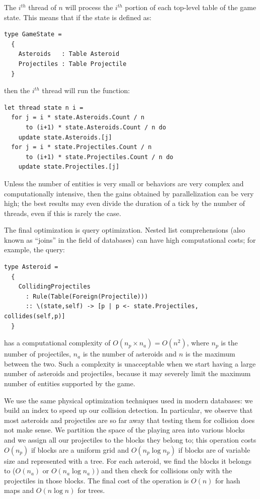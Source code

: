 The $i^{th}$ thread of $n$ will process the $i^{th}$ portion of each top-level table of the game state. This means that if the state is defined as:

\begin{lstlisting}
type GameState = 
  {
    Asteroids   : Table Asteroid
    Projectiles : Table Projectile
  }
\end{lstlisting}

then the $i^{th}$ thread will run the function:

\begin{lstlisting}
let thread state n i =
  for j = i * state.Asteroids.Count / n 
      to (i+1) * state.Asteroids.Count / n do
    update state.Asteroids.[j]
  for j = i * state.Projectiles.Count / n 
      to (i+1) * state.Projectiles.Count / n do
    update state.Projectiles.[j]
\end{lstlisting}

Unless the number of entities is very small or behaviors are very complex and computationally intensive, then the gains obtained by parallelization can be very high; the best results may even divide the duration of a tick by the number of threads, even if this is rarely the case.


The final optimization is query optimization. Nested list comprehensions (also known as ``joins'' in the field of databases) can have high computational costs; for example, the query:

\begin{lstlisting}
type Asteroid =
  {
    CollidingProjectiles 
      : Rule(Table(Foreign(Projectile)))
      :: \(state,self) -> [p | p <- state.Projectiles, collides(self,p)]     
  }
\end{lstlisting}

has a computational complexity of $O(n_p \times n_a) = O(n^2)$, where $n_p$ is the number of projectiles, $n_a$ is the number of asteroids and $n$ is the maximum between the two. Such a complexity is unacceptable when we start having a large number of asteroids and projectiles, because it may severely limit the maximum number of entities supported by the game.

We use the same physical optimization techniques used in modern databases: we build an index to speed up our collision detection. In particular, we observe that most asteroids and projectiles are so far away that testing them for collision does not make sense. We partition the space of the playing area into various blocks and we assign all our projectiles to the blocks they belong to; this operation costs $O(n_p)$ if blocks are a uniform grid and $O(n_p \log n_p)$ if blocks are of variable size and represented with a tree. For each asteroid, we find the blocks it belongs to ($O(n_a)$ or $O(n_a \log n_a)$) and then check for collisions only with the projectiles in those blocks. The final cost of the operation is $O(n)$ for hash maps and $O(n \log n)$ for trees.

